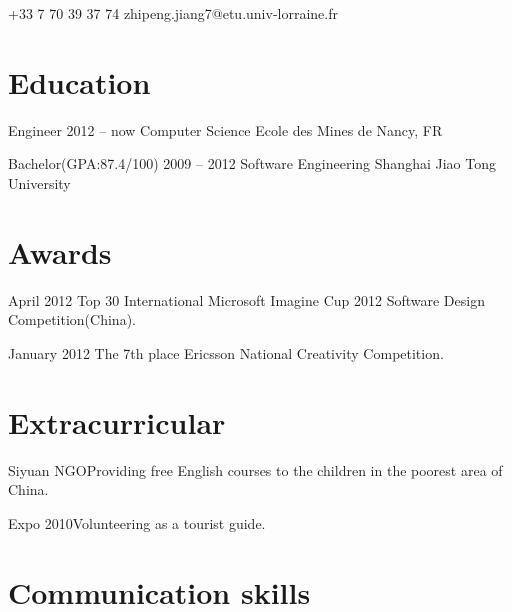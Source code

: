 \documentclass{tccv}
\begin{document}
    {+33 7 70 39 37 74}
    {zhipeng.jiang7@etu.univ-lorraine.fr}

\section{Education}

\begin{yearlist}

\item[Engineer]{2012 -- now}
     {Computer Science}
     {Ecole des Mines de Nancy, FR}

\item[Bachelor(GPA:87.4/100)]{2009 -- 2012}
     {Software Engineering}
     {Shanghai Jiao Tong University}

\end{yearlist}

\section{Awards}

\begin{yearlist}

\item{April 2012}
     {Top 30}
     {International Microsoft Imagine Cup 2012 Software Design Competition(China).}
     
\item{January 2012}
     {The 7th place}
     {Ericsson National Creativity Competition.}

\end{yearlist}

\section{Extracurricular}

\begin{factlist}
\item{Siyuan NGO}{Providing free English courses to the children in the poorest area of China.}
\item{Expo 2010}{Volunteering as a tourist guide.}
\end{factlist}

\section{Communication skills}
\end{document}

